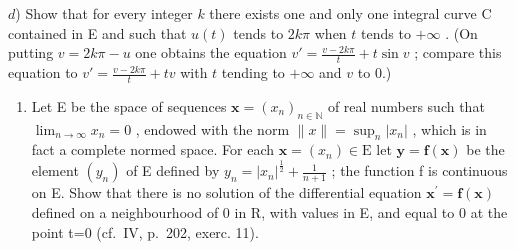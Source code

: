 \(d\)) Show that for every integer \(k\) there exists one and only one integral curve C contained in E and such that \(u(t)\) tends to \(2k\pi\) when \(t\) tends to \(+\infty\) . (On putting \(v = 2k\pi - u\) one obtains the equation \(v' = \frac{v - 2k\pi}{t} + t \sin v\) ; compare this equation to \(v' = \frac{v - 2k\pi}{t} + tv\) with \(t\) tending to \(+\infty\) and \(v\) to 0.)

\begin{enumerate}
\def\labelenumi{\arabic{enumi})}
\setcounter{enumi}{17}
\tightlist
\item
  Let E be the space of sequences \(\mathbf{x}=(x_{n})_{n\in\mathbb{N}}\) of real numbers such that \(\lim_{n\to\infty}x_{n}=0\) , endowed with the norm \(\|x\|=\sup_{n}|x_{n}|\) , which is in fact a complete normed space. For each \(\mathbf{x}=(x_{n})\in\mathrm{E}\) let \(\mathbf{y}=\mathbf{f}(\mathbf{x})\) be the element \((y_{n})\) of E defined by \(y_{n}=|x_{n}|^{\frac{1}{2}}+\frac{1}{n+1}\) ; the function f is continuous on E. Show that there is no solution of the differential equation \(\mathbf{x}^{\prime}=\mathbf{f}(\mathbf{x})\) defined on a neighbourhood of 0 in R, with values in E, and equal to 0 at the point t=0 (cf.~IV, p.~202, exerc. 11).
\end{enumerate}

\setcounter{exercisegroup}{1}
